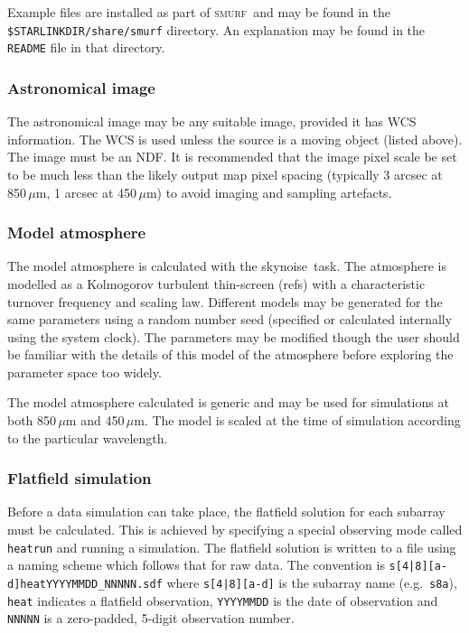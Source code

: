 \documentclass[twoside,11pt]{article}
\newcommand{\xref}[3]{#1}
\renewcommand{\_}{\texttt{\symbol{95}}}
\newcommand{\SMURF}{\textsc{smurf}}
\newcommand{\task}[1]{\textsf{#1}}
\newcommand{\skynoise}{\xref{\task{skynoise}}{sun258}{SKYNOISE}}
\begin{document}
Example files are installed as part of \SMURF\ and may be found in the
\texttt{\$STARLINK\_DIR/share/smurf} directory. An explanation may be
found in the \texttt{README} file in that directory.

\subsubsection{Astronomical image}

The astronomical image may be any suitable image, provided it has WCS
information. The WCS is used unless the source is a moving object
(listed above). The image must be an NDF. It is recommended that the
image pixel scale be set to be much less than the likely output map
pixel spacing (typically 3 arcsec at 850\,$\mu$m, 1 arcsec at
450\,$\mu$m) to avoid imaging and sampling artefacts.

\subsubsection{Model atmosphere}

The model atmosphere is calculated with the \skynoise\ task. The
atmosphere is modelled as a Kolmogorov turbulent thin-screen (refs)
with a characteristic turnover frequency and scaling law. Different
models may be generated for the same parameters using a random number
seed (specified or calculated internally using the system clock). The
parameters may be modified though the user should be familiar with the
details of this model of the atmosphere before exploring the parameter
space too widely.

The model atmosphere calculated is generic and may be used for
simulations at both 850\,$\mu$m and 450\,$\mu$m. The model is scaled
at the time of simulation according to the particular wavelength.

\subsubsection{Flatfield simulation}

Before a data simulation can take place, the flatfield solution for
each subarray must be calculated. This is achieved by specifying a
special observing mode called \texttt{heatrun} and running a
simulation. The flatfield solution is written to a file using a naming
scheme which follows that for raw data. The convention is
\verb+s[4|8][a-d]heatYYYYMMDD_NNNNN.sdf+ where \verb+s[4|8][a-d]+ is
the subarray name (e.g.\ \verb+s8a+), \verb+heat+ indicates a
flatfield observation, \verb+YYYYMMDD+ is the date of observation and
\verb+NNNNN+ is a zero-padded, 5-digit observation number.
\end{document}
